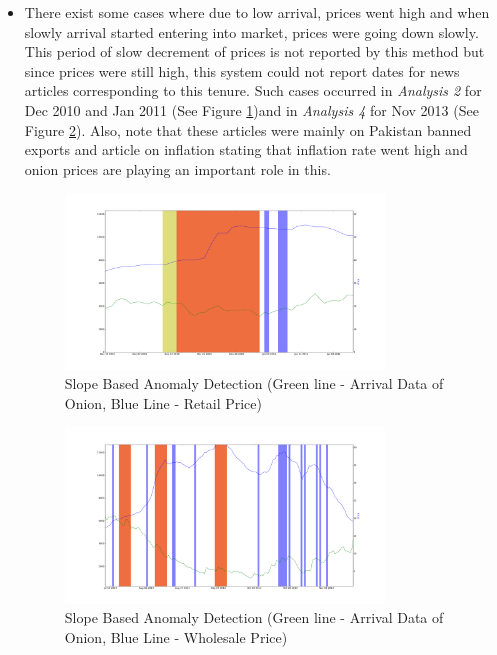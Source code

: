 \begin{itemize}
			\item There exist some cases where due to low arrival, prices went high and when slowly arrival started entering into market, prices were going down slowly. This period of slow decrement of prices is not reported by this method but since prices were still high, this system could not report dates for news articles corresponding to this tenure. Such cases occurred in \textit{Analysis 2} for Dec 2010 and Jan 2011 (See Figure \ref{fig:12124})and in \textit{Analysis 4} for Nov 2013 (See Figure \ref{fig:12144}). Also, note that these articles were mainly on Pakistan banned exports and article on inflation stating that inflation rate went high and onion prices are playing an important role in this.
			
			\begin{figure}[H]
		    	\centering
  		    	\includegraphics[width=0.8\textwidth]{graphs/12124.png}
		    	\caption{Slope Based Anomaly Detection (Green line - Arrival Data of Onion, Blue Line - Retail Price)}
		    	\label{fig:12124}
			\end{figure}
			
			\begin{figure}[H]
		    	\centering
  		    	\includegraphics[width=0.8\textwidth]{graphs/12144.png}
		    	\caption{Slope Based Anomaly Detection (Green line - Arrival Data of Onion, Blue Line - Wholesale Price)}
		    	\label{fig:12144}
			\end{figure}
			

\end{itemize}
